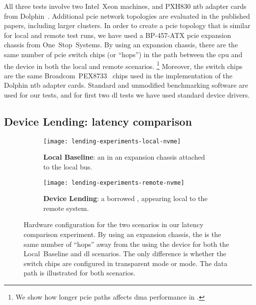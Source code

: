 All three tests involve two Intel~Xeon machines, and PXH830 \gls{ntb} adapter cards from Dolphin~\cite{pxh830}.
%
Additional \gls{pcie} network topologies are evaluated in the published papers, including larger clusters.
%
In order to create a \gls{pcie} topology that is similar for local and remote test runs, we have used a BP-457-ATX \gls{pcie} expansion chassis from One~Stop~Systems.
%
By using an expansion chassis, there are the same number of \gls{pcie} switch chips (or ``hops'') in the path between the \gls{cpu} and the device in both the local and remote scenarios.%
\footnote{We show how longer \gls{pcie} paths affects \gls{dma} performance in .}
%
Moreover, the switch chips are the same  Broadcom~PEX8733~\cite{pex8733} chips used in the implementation of the Dolphin \gls{ntb} adapter cards.
%
Standard and unmodified benchmarking software are used for our tests, and for first two \gls{dl} tests we have used standard device drivers.



\subsection{Device Lending: latency comparison}\label{sec:eval-lat}
\begin{figure}
    \centering
    \begin{subfigure}{\linewidth}
        \centering
        \texttt{[image: lending-experiments-local-nvme]}
        \caption{\textbf{Local Baseline}: an  in an expansion chassis attached to the local  bus.}
        \label{fig:eval-lending-nvme-local}
    \end{subfigure}
    \par\vspace{10mm}
    \begin{subfigure}{\linewidth}
        \centering
        \texttt{[image: lending-experiments-remote-nvme]}
        \caption{\textbf{Device Lending}: a borrowed , appearing local to the remote system.}
        \label{fig:eval-lending-nvme-remote}
    \end{subfigure}
    \par\vspace{5mm}
    \caption[Hardware configuration for the two scenarios in our latency comparison experiment. By using an expansion chassis, the  is the same number of ``hops'' away from the  using the device for both scenarios]
    {Hardware configuration for the two scenarios in our latency comparison experiment. By using an expansion chassis, the  is the same number of ``hops'' away from the  using the device for both the Local~Baseline and \gls{dl} scenarios. The only difference is whether the switch chips are configured in transparent mode or  mode. The data path is illustrated for both scenarios.}
    \label{fig:eval-lending-nvme-topo}
\end{figure}



